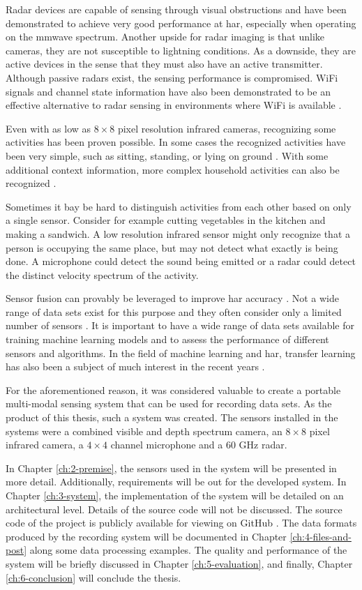 Radar devices are capable of sensing through visual obstructions
and have been demonstrated to achieve very good performance at \gls{har},
especially when operating on the \gls{mmwave} spectrum.
Another upside for radar imaging is that unlike cameras, 
they are not susceptible to lightning conditions. \cite{radar-survey}
As a downside, they are active devices in the sense that they must also have an active transmitter.
Although passive radars exist, the sensing performance is compromised.
WiFi signals and channel state information have also been demonstrated to be an effective alternative to radar sensing
in environments where WiFi is available \cite{sensing-survey}.

Even with as low as $8 \times 8$ pixel resolution infrared cameras,
recognizing some activities has been proven possible.
In some cases the recognized activities have been very simple,
such as sitting, standing, or lying on ground \cite{ir-simple-activities}.
With some additional context information,
more complex household activities can also be recognized \cite{ir-household}.

Sometimes it bay be hard to distinguish activities from each other based on only a single sensor.
Consider for example cutting vegetables in the kitchen and making a sandwich.
A low resolution infrared sensor might only recognize that a person is occupying the same place,
but may not detect what exactly is being done. A microphone could detect the sound being emitted
or a radar could detect the distinct velocity spectrum of the activity.

Sensor fusion can provably be leveraged to improve \gls{har} accuracy \cite{fusion1, fusion2}.
Not a wide range of data sets exist for this purpose and they often consider only a limited number of sensors \cite{sensing-survey}.
It is important to have a wide range of data sets available for training machine learning models
and to assess the performance of different sensors and algorithms.
In the field of machine learning and \gls{har}, transfer learning has also been a subject of much interest in the recent years \cite{transfer}.

For the aforementioned reason,
it was considered valuable to create a portable multi-modal sensing system that can be used for recording data sets.
As the product of this thesis, such a system was created.
The sensors installed in the systems were a combined visible and depth spectrum camera,
an $8 \times 8$ pixel infrared camera, a $4 \times 4$ channel microphone and a 60 GHz radar.

In Chapter \ref{ch:2-premise}, the sensors used in the system will be presented in more detail.
Additionally, requirements will be out for the developed system.
In Chapter \ref{ch:3-system}, the implementation of the system will be detailed on an architectural level.
Details of the source code will not be discussed. The source code of the project is publicly available for viewing on GitHub \cite{github-link}.
The data formats produced by the recording system will be documented in Chapter \ref{ch:4-files-and-post} along some data processing examples.
The quality and performance of the system will be briefly discussed in Chapter \ref{ch:5-evaluation},
and finally, Chapter \ref{ch:6-conclusion} will conclude the thesis.